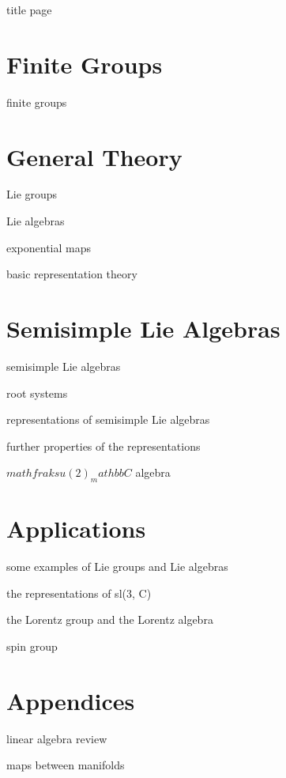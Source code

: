 \documentclass[10pt, a4paper]{report}
\numberwithin{equation}{section}
\begin{document}
	{title page}
	
	\tableofcontents
	
	\part{Finite Groups}
	
	{finite groups}
	
	\part{General Theory}
	
	{Lie groups}
	
	{Lie algebras}
	
	{exponential maps}
	
	{basic representation theory}
	
	\part{Semisimple Lie Algebras}
	
	{semisimple Lie algebras}
	
	{root systems}
	
	{representations of semisimple Lie algebras}
	
	{further properties of the representations}
	
	{$mathfrak{su}(2)_mathbb{C}$ algebra}
	
	\part{Applications}
	
	{some examples of Lie groups and Lie algebras}
	
	{the representations of sl(3, C)}
	
	{the Lorentz group and the Lorentz algebra}
	
	{spin group}
	
	\appendix
	
	\part*{Appendices}
	
	{linear algebra review}
	
	{maps between manifolds}
\end{document}
